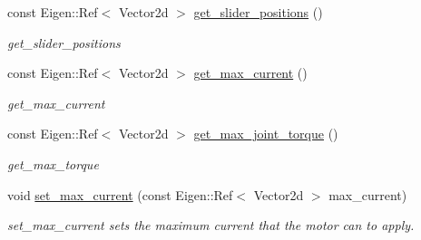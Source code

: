 \begin{DoxyCompactItemize}
const Eigen\+::\+Ref$<$ Vector2d $>$ \hyperlink{classblmc__robots_1_1SingleLeg_aa0b97287dcf0195fe918e1b4c0e7b470}{get\+\_\+slider\+\_\+positions} ()
\begin{DoxyCompactList}\small\item\em get\+\_\+slider\+\_\+positions \end{DoxyCompactList}\item 
const Eigen\+::\+Ref$<$ Vector2d $>$ \hyperlink{classblmc__robots_1_1SingleLeg_a662082708a0f24a120306e07490a0b70}{get\+\_\+max\+\_\+current} ()
\begin{DoxyCompactList}\small\item\em get\+\_\+max\+\_\+current \end{DoxyCompactList}\item 
const Eigen\+::\+Ref$<$ Vector2d $>$ \hyperlink{classblmc__robots_1_1SingleLeg_ace93cc10397888f07ecf5e14583535f9}{get\+\_\+max\+\_\+joint\+\_\+torque} ()
\begin{DoxyCompactList}\small\item\em get\+\_\+max\+\_\+torque \end{DoxyCompactList}\item 
void \hyperlink{classblmc__robots_1_1SingleLeg_a54007e95c258ec05b63169f202d3a3a0}{set\+\_\+max\+\_\+current} (const Eigen\+::\+Ref$<$ Vector2d $>$ max\+\_\+current)
\begin{DoxyCompactList}\small\item\em set\+\_\+max\+\_\+current sets the maximum current that the motor can to apply. \end{DoxyCompactList}\end{DoxyCompactItemize}
